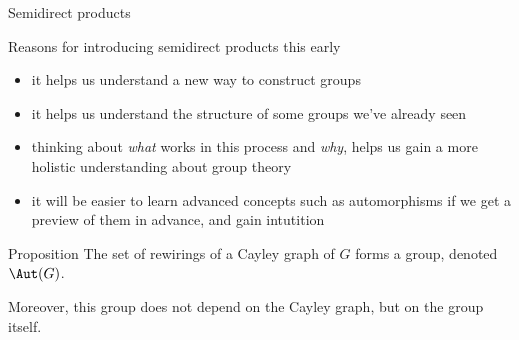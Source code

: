 \documentclass[8pt, handout]{beamer}
\newcommand{\Pause}{}
\begin{document}
\begin{frame}{Semidirect products} 

  \begin{exampleblock}{Reasons for introducing semidirect products this early}
    \Pause
    \begin{itemize}
    \item it helps us understand a new way to construct
      groups \medskip\Pause

    \item it helps us understand the structure of some groups we've
      already seen \medskip\Pause
      
    \item thinking about \emph{what} works in this process and
      \emph{why}, helps us gain a more holistic understanding about
      group theory \medskip\Pause
    \item it will be easier to learn advanced concepts such as
      automorphisms if we get a preview of them in advance, and gain
      intutition
    \end{itemize}
  \end{exampleblock}

  \begin{block}{Proposition}
    The set of rewirings of a Cayley graph of $G$ forms a group,
    denoted $\Aut(G)$. \medskip

    Moreover, this group does not depend on the Cayley graph, but on
    the group itself.
  \end{block}
  
\end{frame}
  
\end{document}

